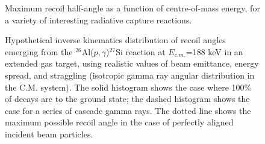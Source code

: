 \begin{figure}
\caption{Maximum recoil half-angle as a function of centre-of-mass energy, for a variety of interesting radiative capture reactions.}
\label{fig:coneangles}       %
\end{figure}

\begin{figure}
\caption{Hypothetical inverse kinematics distribution of recoil angles emerging from the $^{26}$Al($p,\gamma$)$^{27}$Si reaction at $E_{c.m.}$=188 keV in an extended gas target, using realistic values of beam emittance, energy spread, and straggling (isotropic gamma ray angular distribution in the C.M. system). The solid histogram shows the case where 100\% of decays are to the ground state; the dashed histogram shows the case for a series of cascade gamma rays. The dotted line shows the maximum possible recoil angle in the case of perfectly aligned incident beam particles. }
\label{fig:26altheta}       %
\end{figure}

